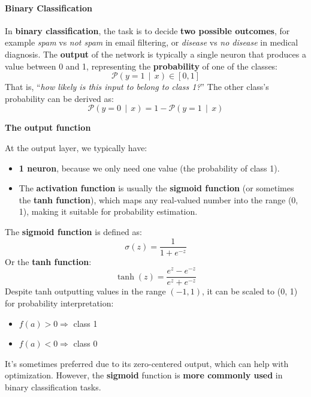 \paragraph{Binary Classification}

In \textbf{binary classification}, the task is to decide \textbf{two possible outcomes}, for example \textit{spam} vs \textit{not spam} in email filtering, or \textit{disease} vs \textit{no disease} in medical diagnosis. The \textbf{output} of the network is typically a single neuron that produces a value between 0 and 1, representing the \textbf{probability} of one of the classes:
\begin{equation*}
    \mathcal{P}\left(y=1 \, \mid \, x\right) \in \left[0, 1\right]
\end{equation*}
That is, ``\emph{how likely is this input to belong to class 1?}'' The other class's probability can be derived as:
\begin{equation*}
    \mathcal{P}\left(y=0 \, \mid \, x\right) = 1 - \mathcal{P}\left(y=1 \, \mid \, x\right)
\end{equation*}

\begin{flushleft}
    \textcolor{Green3}{ \textbf{The output function}}
\end{flushleft}
At the output layer, we typically have:
\begin{itemize}
    \item \textbf{1 neuron}, because we only need one value (the probability of class 1).
    \item The \textbf{activation function} is usually the \textbf{sigmoid function} (or sometimes the \textbf{tanh function}), which maps any real-valued number into the range (0, 1), making it suitable for probability estimation.
\end{itemize}
The \textbf{sigmoid function} is defined as:
\begin{equation*}
    \sigma(z) = \frac{1}{1 + e^{-z}}
\end{equation*}
Or the \textbf{tanh function}:
\begin{equation*}
    \tanh(z) = \frac{e^{z} - e^{-z}}{e^{z} + e^{-z}}
\end{equation*}
Despite tanh outputting values in the range $(-1, 1)$, it can be scaled to (0, 1) for probability interpretation:
\begin{itemize}
    \item $f(a) > 0 \Rightarrow$ class 1
    \item $f(a) < 0 \Rightarrow$ class 0
\end{itemize}
It's sometimes preferred due to its zero-centered output, which can help with optimization. However, the \textbf{sigmoid} function is \textbf{more commonly used} in binary classification tasks.

